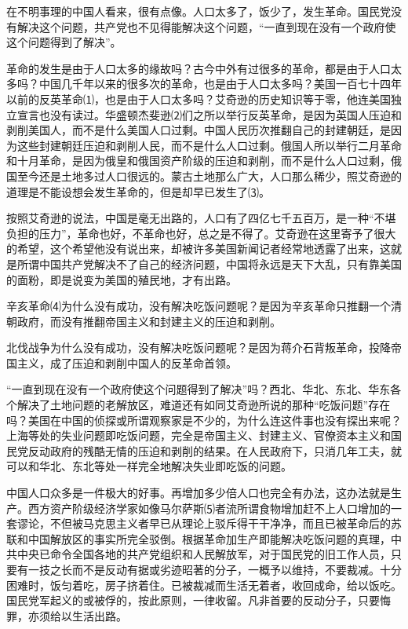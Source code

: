 \documentclass[UTF-8, a5paper, 12pt]{ctexart}
\begin{document}
在不明事理的中国人看来，很有点像。人口太多了，饭少了，发生革命。国民党没有解决这个问题，共产党也不见得能解决这个问题，“一直到现在没有一个政府使这个问题得到了解决”。

革命的发生是由于人口太多的缘故吗？古今中外有过很多的革命，都是由于人口太多吗？中国几千年以来的很多次的革命，也是由于人口太多吗？美国一百七十四年以前的反英革命⑴，也是由于人口太多吗？艾奇逊的历史知识等于零，他连美国独立宣言也没有读过。华盛顿杰斐逊⑵们之所以举行反英革命，是因为英国人压迫和剥削美国人，而不是什么美国人口过剩。中国人民历次推翻自己的封建朝廷，是因为这些封建朝廷压迫和剥削人民，而不是什么人口过剩。俄国人所以举行二月革命和十月革命，是因为俄皇和俄国资产阶级的压迫和剥削，而不是什么人口过剩，俄国至今还是土地多过人口很远的。蒙古土地那么广大，人口那么稀少，照艾奇逊的道理是不能设想会发生革命的，但是却早已发生了⑶。

按照艾奇逊的说法，中国是毫无出路的，人口有了四亿七千五百万，是一种“不堪负担的压力”，革命也好，不革命也好，总之是不得了。艾奇逊在这里寄予了很大的希望，这个希望他没有说出来，却被许多美国新闻记者经常地透露了出来，这就是所谓中国共产党解决不了自己的经济问题，中国将永远是天下大乱，只有靠美国的面粉，即是说变为美国的殖民地，才有出路。

辛亥革命⑷为什么没有成功，没有解决吃饭问题呢？是因为辛亥革命只推翻一个清朝政府，而没有推翻帝国主义和封建主义的压迫和剥削。

北伐战争为什么没有成功，没有解决吃饭问题呢？是因为蒋介石背叛革命，投降帝国主义，成了压迫和剥削中国人的反革命首领。

“一直到现在没有一个政府使这个问题得到了解决”吗？西北、华北、东北、华东各个解决了土地问题的老解放区，难道还有如同艾奇逊所说的那种“吃饭问题”存在吗？美国在中国的侦探或所谓观察家是不少的，为什么连这件事也没有探出来呢？上海等处的失业问题即吃饭问题，完全是帝国主义、封建主义、官僚资本主义和国民党反动政府的残酷无情的压迫和剥削的结果。在人民政府下，只消几年工夫，就可以和华北、东北等处一样完全地解决失业即吃饭的问题。

中国人口众多是一件极大的好事。再增加多少倍人口也完全有办法，这办法就是生产。西方资产阶级经济学家如像马尔萨斯⑸者流所谓食物增加赶不上人口增加的一套谬论，不但被马克思主义者早已从理论上驳斥得干干净净，而且已被革命后的苏联和中国解放区的事实所完全驳倒。根据革命加生产即能解决吃饭问题的真理，中共中央已命令全国各地的共产党组织和人民解放军，对于国民党的旧工作人员，只要有一技之长而不是反动有据或劣迹昭著的分子，一概予以维持，不要裁减。十分困难时，饭匀着吃，房子挤着住。已被裁减而生活无着者，收回成命，给以饭吃。国民党军起义的或被俘的，按此原则，一律收留。凡非首要的反动分子，只要悔罪，亦须给以生活出路。
\end{document}
